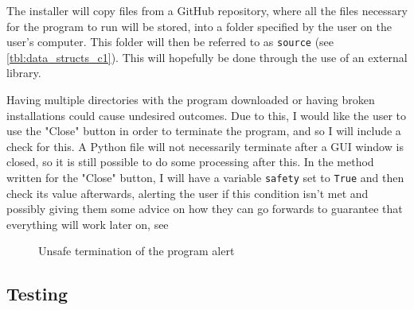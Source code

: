 \documentclass[11pt]{article}
\begin{document}
                The installer will copy files from a GitHub repository, where all the files necessary for the program to run will be stored, into a folder specified by the user on the user's computer. This folder will then be referred to as \verb|source| (see \autoref{tbl:data_structs_c1}). This will hopefully be done through the use of an external library.

                Having multiple directories with the program downloaded or having broken installations could cause undesired outcomes. Due to this, I would like the user to use the "Close" button in order to terminate the program, and so I will include a check for this. A Python file will not necessarily terminate after a GUI window is closed, so it is still possible to do some processing after this. In the method written for the "Close" button, I will have a variable \verb|safety| set to \verb|True| and then check its value afterwards, alerting the user if this condition isn't met and possibly giving them some advice on how they can go forwards to guarantee that everything will work later on, see 

                \begin{figure}[!ht]
                    \centering
                    \caption{Unsafe termination of the program alert}
                    \label{fig:installer_ui_design_unsafe_exit_c1}
                \end{figure}

        \subsection{Testing}
\end{document}
